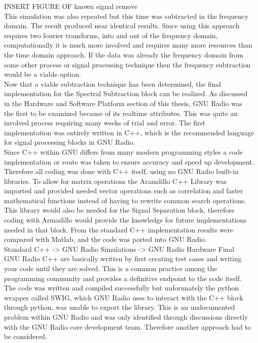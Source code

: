 INSERT FIGURE OF known signal remove\\

This simulation was also repeated but this time was subtracted in the frequency domain.  The result produced near identical results.  Since using this approach requires two fourier transforms, into and out of the frequency domain, computationally it is much more involved and requires many more resources than the time domain approach.  If the data was already the frequency domain from some other process or signal processing technique then the frequency subtraction would be a viable option.\\

Now that a viable subtraction technique has been determined, the final implementation for the Spectral Subtraction block can be realized.  As discussed in the Hardware and Software Platform section of this thesis, GNU Radio was the first to be examined because of its realtime attributes.  This was quite an involved process requiring many weeks of trial and error.  The first implementation was entirely written in C++, which is the recommended language for signal processing blocks in GNU Radio.\\  

Since C++ within GNU differs from many modern programming styles a code implementation or route was taken to ensure accuracy and speed up development.  Therefore all coding was done with C++ itself, using no GNU Radio built-in libraries\cite{gnuradioCPP}.  To allow for matrix operations the Aramdillo C++ Library\cite{armadillo} was imported and provided needed vector operations such as correlation and faster mathematical functions instead of having to rewrite common search operations.  This library would also be needed for the Signal Separation block, therefore coding with Armadillo would provide the knowledge for future implementations needed in that block.  From the standard C++ implementation results were compared with Matlab, and the code was ported into GNU Radio.\\

Standard C++ -> GNU Radio Simulations -> GNU Radio Hardware Final\\

GNU Radio C++ are basically written by first creating test cases and writing your code until they are solved.  This is a common practice among the programming community and provides a definitive endpoint to the code itself.  The code was written and compiled successfully but unforunately the python wrapper called SWIG\cite{swig}, which GNU Radio uses to interact with the C++ block through python, was unable to export the library.  This is an undocumented problem within GNU Radio and was only identified through discussions directly with the GNU Radio core development team.  Therefore another approach had to be considered.\\

